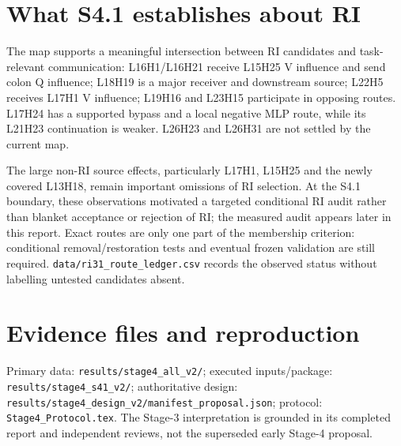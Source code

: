 \documentclass[11pt,a4paper]{article}
\newcommand{\file}[1]{\nolinkurl{#1}}
\begin{document}
\section{What S4.1 establishes about RI}
The map supports a meaningful intersection between RI candidates and task-relevant communication: L16H1/L16H21 receive L15H25 V influence and send colon Q influence; L18H19 is a major receiver and downstream source; L22H5 receives L17H1 V influence; L19H16 and L23H15 participate in opposing routes. L17H24 has a supported bypass and a local negative MLP route, while its L21H23 continuation is weaker. L26H23 and L26H31 are not settled by the current map.

The large non-RI source effects, particularly L17H1, L15H25 and the newly covered L13H18, remain important omissions of RI selection. At the S4.1 boundary, these observations motivated a targeted conditional RI audit rather than blanket acceptance or rejection of RI; the measured audit appears later in this report. Exact routes are only one part of the membership criterion: conditional removal/restoration tests and eventual frozen validation are still required. \file{data/ri31_route_ledger.csv} records the observed status without labelling untested candidates absent.



\appendix
\small
\section{Evidence files and reproduction}
Primary data: \file{results/stage4_all_v2/}; executed inputs/package:
\file{results/stage4_s41_v2/}; authoritative design:
\file{results/stage4_design_v2/manifest_proposal.json}; protocol:
\file{Stage4_Protocol.tex}. The Stage-3 interpretation is grounded in its completed report and independent reviews, not the superseded early Stage-4 proposal.
\end{document}
